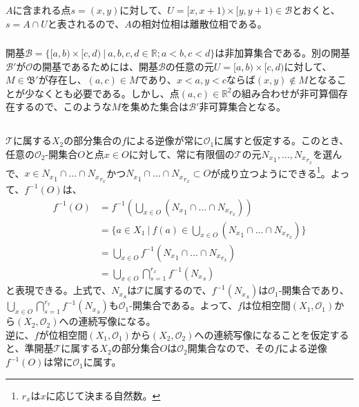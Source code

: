 \documentclass{jsarticle}
\begin{document}
\subsubsection{}
$A$に含まれる点$s=(x,y)$に対して、$U=[x,x+1)\times[y,y+1)\in\mathcal{B}$とおくと、$s=A\cap U$と表されるので、$A$の相対位相は離散位相である。
\subsubsection{}
開基$\mathcal{B}=\{[a,b)\times[c,d)\ |\ a,b,c,d\in\mathbb{R}; a<b, c<d\}$は非加算集合である。別の開基$\mathcal{B}'$が$\mathcal{O}$の開基であるためには、開基$\mathcal{B}$の任意の元$U=[a,b)\times[c,d)$に対して、$M\in\mathfrak{B}'$が存在し、$(a,c)\in M$であり、$x<a,y<cならば(x,y)\notin M$となることが少なくとも必要である。しかし、点$(a,c)\in\mathbb{R}^2$の組み合わせが非可算個存在するので、このような$M$を集めた集合は$\mathcal{B}'$非可算集合となる。

\subsection{}
$\mathcal{T}$に属する$X_2$の部分集合の$f$による逆像が常に$\mathcal{O}_1$に属すと仮定する。このとき、任意の$\mathcal{O}_2$-開集合$O$と点$x\in O$に対して、常に有限個の$\mathcal{T}$の元${N_x}_{1},...,{N_x}_{r_x}$を選んで、$x\in {N_x}_{1}\cap...\cap {N_x}_{r_x}$かつ${N_x}_{1}\cap...\cap {N_x}_{r_x}\subset O$が成り立つようにできる\footnote{$r_x$は$x$に応じて決まる自然数。}。よって、$f^{-1}(O)$は、
\begin{align*}
f^{-1}(O)&=f^{-1}(\bigcup_{x\in O}({N_x}_{1}\cap...\cap {N_x}_{r_x}))\\
&=\{a\in X_1\ |\ f(a)\in\bigcup_{x\in O}({N_x}_{1}\cap...\cap {N_x}_{r_x})\} \\
&=\bigcup_{x\in O}f^{-1}({N_x}_{1}\cap...\cap {N_x}_{r_x})\\
&=\bigcup_{x\in O}\bigcap_{s=1}^{r_x}f^{-1}({N_x}_s)
\end{align*}
と表現できる。上式で、${N_x}_s$は$\mathcal{T}$に属するので、$f^{-1}({N_x}_s)$は$\mathcal{O}_1$-開集合であり、$\bigcup_{x\in O}\bigcap_{s=1}^{r_x}f^{-1}({N_x}_s)$も$\mathcal{O}_1$-開集合である。よって、$f$は位相空間$(X_1,\mathcal{O}_1)$から$(X_2,\mathcal{O}_2)$への連続写像になる。\\
逆に、$f$が位相空間$(X_1,\mathcal{O}_1)$から$(X_2,\mathcal{O}_2)$への連続写像になることを仮定すると、準開基$\mathcal{T}$に属する$X_2$の部分集合$O$は$\mathcal{O}_2$開集合なので、その$f$による逆像$f^{-1}(O)$は常に$\mathcal{O}_1$に属す。
\end{document}
